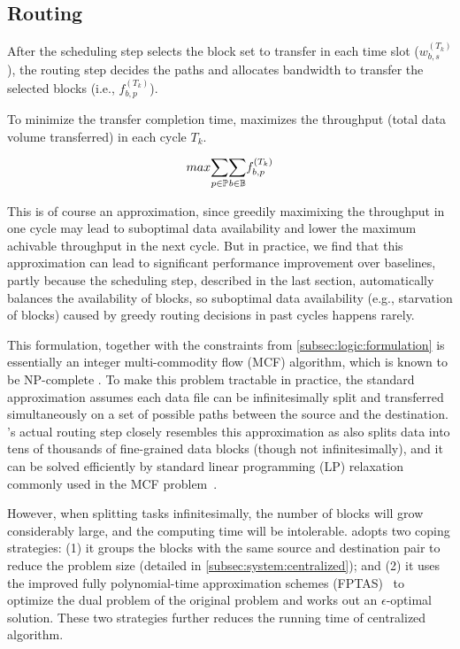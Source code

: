 \subsection{Routing}
\label{subsec:logic:routing}

After the scheduling step selects the block set to transfer in each
time slot ($w^{(T_k)}_{b,s}$), the routing step decides the paths and
allocates bandwidth to transfer the selected blocks (i.e.,
$f_{b,p}^{(T_k)}$).

To minimize the transfer completion time, \name maximizes the
throughput (total data volume transferred) in each cycle $T_k$.

\begin{equation}
\centering
max \displaystyle{\sum_{p\in \mathbb{P}}}
\displaystyle{\sum_{b\in \mathbb{B}}}
f_{b,p}^{(T_k)}
\end{equation}

This is of course an approximation, since greedily maximixing the
throughput in one cycle may lead to suboptimal data availability and
lower the maximum achivable throughput in the next cycle. But in
practice, we find that this approximation can lead to significant
performance improvement over baselines, partly because the scheduling
step, described in the last section, automatically balances the
availability of blocks, so suboptimal data availability (e.g.,
starvation of blocks) caused by greedy routing decisions in past
cycles happens rarely.

This formulation, together with the constraints from
\Section\ref{subsec:logic:formulation} is essentially an integer
multi-commodity flow (MCF) algorithm, which is known to be
NP-complete \cite{garg1997primal}. To make this problem tractable in
practice, the standard approximation assumes each data file can be
infinitesimally split and transferred simultaneously on a set of
possible paths between the source and the destination. \name's actual
routing step closely resembles this approximation as \name also
splits data into tens of thousands of fine-grained data blocks
(though not infinitesimally), and it can be solved efficiently by
standard linear programming (LP) relaxation commonly used in the MCF
problem~\cite{garg2007faster,reed2012traffic}.

However, when splitting tasks infinitesimally, the number of blocks
will grow considerably large, and the computing time will be
intolerable. \name adopts two coping strategies: (1) it groups the
blocks with the same source and destination pair to reduce the
problem size (detailed in \Section\ref{subsec:system:centralized});
and (2) it uses the improved fully polynomial-time approximation
schemes (FPTAS)~\cite{fleischer2000approximating} to optimize the
dual problem of the original problem and works out an
$\epsilon$-optimal solution. These two strategies further reduces the
running time of centralized algorithm.





